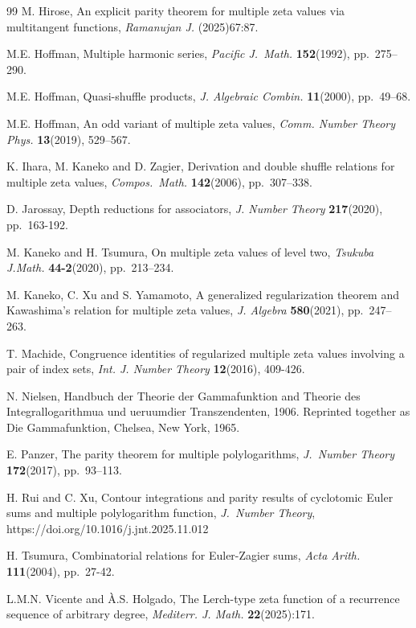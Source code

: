 \documentclass[11pt]{article}
\theoremstyle{plain}
\theoremstyle{definition}
\begin{document}
\begin{thebibliography}{99}
M. Hirose, An explicit parity theorem for multiple zeta values via multitangent functions, \emph{Ramanujan J.} (2025)67:87.

M.E. Hoffman, Multiple harmonic series, \emph{Pacific J.\ Math.} \textbf{152}(1992), pp.\ 275--290.

M.E. Hoffman, Quasi-shuffle products, \emph{J. Algebraic Combin.} \textbf{11}(2000), pp.\ 49--68.

M.E. Hoffman, An odd variant of multiple zeta values, \emph{Comm. Number Theory Phys.} \textbf{13}(2019), 529--567.

K. Ihara, M. Kaneko and D. Zagier, Derivation and double shuffle relations for multiple zeta values, \emph{Compos.\ Math.} \textbf{142}(2006), pp.\ 307--338.

D. Jarossay, Depth reductions for associators, \emph{J. Number Theory} \textbf{217}(2020), pp.\ 163-192.

M. Kaneko and H. Tsumura, On multiple zeta values of level two, \emph{Tsukuba J.Math.} \textbf{44-2}(2020), pp.\ 213--234.

M. Kaneko, C. Xu and S. Yamamoto, A generalized regularization theorem and Kawashima's relation for multiple zeta values, \emph{J. Algebra} {\bf 580}(2021), pp.\ 247--263.

T. Machide, Congruence identities of regularized multiple zeta values involving a pair of index sets, \emph{Int. J. Number Theory} \textbf{12}(2016), 409-426.

N. Nielsen, Handbuch der Theorie der Gammafunktion and Theorie des Integrallogarithmua und ueruumdier Transzendenten, 1906. Reprinted together as Die Gammafunktion, Chelsea, New York,
1965.

E. Panzer, The parity theorem for multiple polylogarithms, \emph{J.\ Number Theory} \textbf{172}(2017), pp.\ 93--113.

H. Rui and C. Xu, Contour integrations and parity results of cyclotomic Euler sums and multiple polylogarithm function, \emph{J.\ Number Theory}, https://doi.org/10.1016/j.jnt.2025.11.012


H. Tsumura, Combinatorial relations for Euler-Zagier sums, \emph{Acta Arith.} \textbf{111}(2004), pp.\ 27-42.

L.M.N. Vicente and \`{A}.S. Holgado, The Lerch-type zeta function of a recurrence sequence of arbitrary degree, \emph{Mediterr. J. Math.} \textbf{22}(2025):171.


\end{thebibliography}
\end{document}
